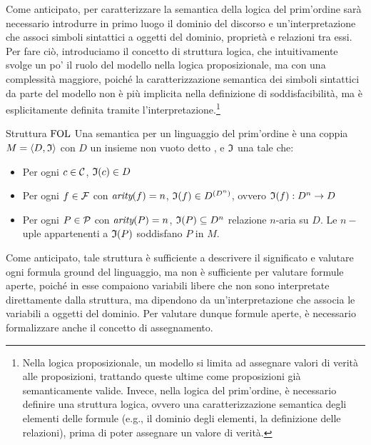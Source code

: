 Come anticipato, per caratterizzare la semantica della logica del prim'ordine sarà necessario introdurre in primo luogo il dominio del discorso e un'interpretazione che associ simboli sintattici a oggetti del dominio, proprietà e relazioni tra essi. Per fare ciò, introduciamo il concetto di struttura logica, che intuitivamente svolge un po' il ruolo del modello nella logica proposizionale, ma con una complessità maggiore, poiché la caratterizzazione semantica dei simboli sintattici da parte del modello non è più implicita nella definizione di soddisfacibilità, ma è esplicitamente definita tramite l'interpretazione.\footnote{Nella logica proposizionale, un modello si limita ad assegnare valori di verità alle proposizioni, trattando queste ultime come proposizioni già semanticamente valide. Invece, nella logica del prim'ordine, è necessario definire una struttura logica, ovvero una caratterizzazione semantica degli elementi delle formule (e.g., il dominio degli elementi, la definizione delle relazioni), prima di poter assegnare un valore di verità.} 

\begin{definition}{Struttura \(\FOL\)}
  Una  semantica per un linguaggio del prim'ordine è una coppia \(M = \langle D, \mathfrak{I} \rangle\) con \(D\) un insieme non vuoto detto , e \(\mathfrak{I}\) una  tale che:
  \begin{itemize}
    \item Per ogni \(c\in\mathcal{C}\), \(\mathfrak{I}(c)\in D\)
    \item Per ogni \(f\in\mathcal{F}\) con \(\operatorname{\textit{arity}}(f)=n\), \(\mathfrak{I}(f) \in D^{(D^n)}\),  ovvero \(\mathfrak{I}(f): D^n \to D\)
    \item Per ogni \(P\in\mathcal{P}\) con \(\operatorname{\textit{arity}}(P)=n\), \(\mathfrak{I}(P)\subseteq D^n\) relazione \(n\)-aria su \(D\). Le \(n-\)uple appartenenti a \(\mathfrak{I}(P)\) soddisfano \(P\) in \(M\).
  \end{itemize}
\end{definition}

Come anticipato, tale struttura è sufficiente a descrivere il significato e valutare ogni formula ground del linguaggio, ma non è sufficiente per valutare formule aperte, poiché in esse compaiono variabili libere che non sono interpretate direttamente dalla struttura, ma dipendono da un'interpretazione che associa le variabili a oggetti del dominio. Per valutare dunque formule aperte, è necessario formalizzare anche il concetto di assegnamento.

